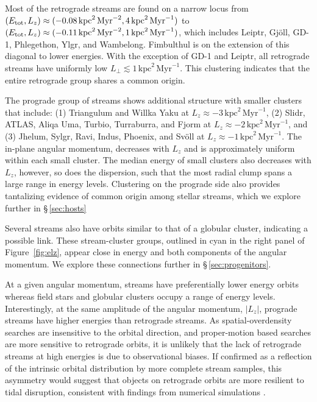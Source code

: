 \documentclass[twocolumn]{aastex63}
\newcommand{\ul}{\ensuremath{\textrm{kpc}^2\,\textrm{Myr}^{-1}}}
\newcommand{\ue}{\ensuremath{\textrm{kpc}^2\,\textrm{Myr}^{-2}}}
\begin{document}
Most of the retrograde streams are found on a narrow locus from $(E_{\rm tot}, L_z)\approx(-0.08\,\ue,\allowbreak 4\,\ul)$ to $(E_{\rm tot}, L_z)\approx(-0.11\,\ue,\allowbreak 1\,\ul)$, which includes Leiptr, Gj\" oll, GD-1, Phlegethon, Ylgr, and Wambelong.
Fimbulthul is on the extension of this diagonal to lower energies.
With the exception of GD-1 and Leiptr, all retrograde streams have uniformly low $L_\perp\lesssim1\,\ul$.
This clustering indicates that the entire retrograde group shares a common origin.

The prograde group of streams shows additional structure with smaller clusters that include: (1) Triangulum and Willka Yaku at $L_z\approx-3\,\ul$, (2) Slidr, ATLAS, Aliqa Uma, Turbio, Turraburra, and Fjorm at $L_z\approx-2\,\ul$, and (3) Jhelum, Sylgr, Ravi, Indus, Phoenix, and Sv\" oll at $L_z\approx-1\,\ul$.
The in-plane angular momentum, decreases with $L_z$ and is approximately uniform within each small cluster.
The median energy of small clusters also decreases with $L_z$, however, so does the dispersion, such that the most radial clump spans a large range in energy levels.
Clustering on the prograde side also provides tantalizing evidence of common origin among stellar streams, which we explore further in \S\,\ref{sec:hosts}

Several streams also have orbits similar to that of a globular cluster, indicating a possible link.
These stream-cluster groups, outlined in cyan in the right panel of Figure~\ref{fig:elz}, appear close in energy and both components of the angular momentum.
We explore these connections further in \S\,\ref{sec:progenitors}.

At a given angular momentum, streams have preferentially lower energy orbits whereas field stars and globular clusters occupy a range of energy levels.
Interestingly, at the same amplitude of the angular momentum, $|L_z|$, prograde streams have higher energies than retrograde streams.
As spatial-overdensity searches are insensitive to the orbital direction, and proper-motion based searches are more sensitive to retrograde orbits, it is unlikely that the lack of retrograde streams at high energies is due to observational biases.
If confirmed as a reflection of the intrinsic orbital distribution by more complete stream samples, this asymmetry would suggest that objects on retrograde orbits are more resilient to tidal disruption, consistent with findings from numerical simulations \citep[e.g.,][]{find}.
\end{document}
